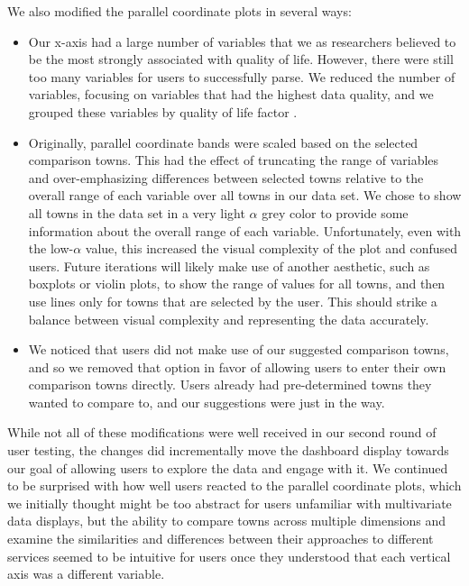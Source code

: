 \documentclass[letterpaper,inpress]{jdsart}
\providecommand{\tightlist}{%
  \setlength{\itemsep}{0pt}\setlength{\parskip}{0pt}}
\begin{document}
We also modified the parallel coordinate plots in several ways:

\begin{itemize}
\tightlist
\item
  Our x-axis had a large number of variables that we as researchers believed to be the most strongly associated with quality of life. However, there were still too many variables for users to successfully parse. We reduced the number of variables, focusing on variables that had the highest data quality, and we grouped these variables by quality of life factor \citep{petersCommunityResiliencyDeclining2019}.
\item
  Originally, parallel coordinate bands were scaled based on the selected comparison towns. This had the effect of truncating the range of variables and over-emphasizing differences between selected towns relative to the overall range of each variable over all towns in our data set. We chose to show all towns in the data set in a very light \(\alpha\) grey color to provide some information about the overall range of each variable. Unfortunately, even with the low-\(\alpha\) value, this increased the visual complexity of the plot and confused users. Future iterations will likely make use of another aesthetic, such as boxplots or violin plots, to show the range of values for all towns, and then use lines only for towns that are selected by the user. This should strike a balance between visual complexity and representing the data accurately.
\item
  We noticed that users did not make use of our suggested comparison towns, and so we removed that option in favor of allowing users to enter their own comparison towns directly. Users already had pre-determined towns they wanted to compare to, and our suggestions were just in the way.
\end{itemize}

While not all of these modifications were well received in our second round of user testing, the changes did incrementally move the dashboard display towards our goal of allowing users to explore the data and engage with it. We continued to be surprised with how well users reacted to the parallel coordinate plots, which we initially thought might be too abstract for users unfamiliar with multivariate data displays, but the ability to compare towns across multiple dimensions and examine the similarities and differences between their approaches to different services seemed to be intuitive for users once they understood that each vertical axis was a different variable.
\end{document}
